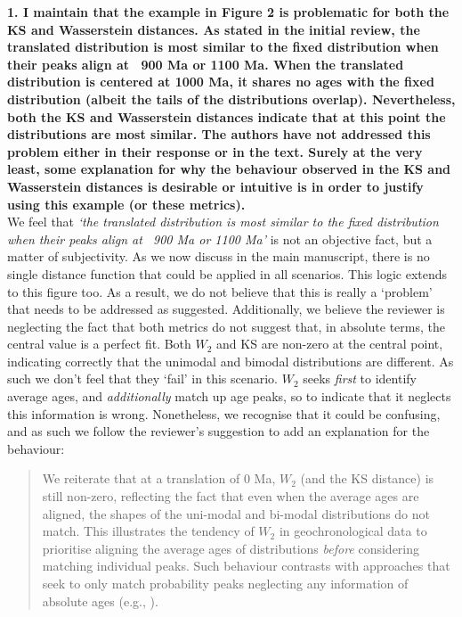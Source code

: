 \documentclass{article}[12p,a4paper]
\begin{document}
\textbf{1. I maintain that the example in Figure 2 is problematic for both the KS and Wasserstein distances. As stated in the initial review, the translated distribution is most similar to the fixed distribution when their peaks align at ~900 Ma or 1100 Ma. When the translated distribution is centered at 1000 Ma, it shares no ages with the fixed distribution (albeit the tails of the distributions overlap). Nevertheless, both the KS and Wasserstein distances indicate that at this point the distributions are most similar. The authors have not addressed this problem either in their response or in the text. Surely at the very least, some explanation for why the behaviour observed in the KS and Wasserstein distances is desirable or intuitive is in order to justify using this example (or these metrics). }\\

We feel that \textit{`the translated distribution is most similar to the fixed distribution when their peaks align at ~900 Ma or 1100 Ma'} is not an objective fact, but a matter of subjectivity. As we now discuss in the main manuscript, there is no single distance function that could be applied in all scenarios. This logic extends to this figure too. As a result, we do not believe that this is really a `problem' that needs to be addressed as suggested. Additionally, we believe the reviewer is neglecting the fact that both metrics do not suggest that, in absolute terms, the central value is a perfect fit. Both $W_2$ and KS are non-zero at the central point, indicating correctly that the unimodal and bimodal distributions are different. As such we don't feel that they `fail' in this scenario. $W_2$ seeks \textit{first} to identify average ages, and \textit{additionally} match up age peaks, so to indicate that it neglects this information is wrong. Nonetheless, we recognise that it could be confusing, and as such we follow the reviewer's suggestion to add an explanation for the behaviour:

\begin{quote}
    We reiterate that at a translation of 0 Ma, $W_2$ (and the KS distance) is still non-zero, reflecting the fact that even when the average ages are aligned, the shapes of the uni-modal and bi-modal distributions do not match. This illustrates the tendency of $W_2$ in geochronological data to prioritise aligning the average ages of distributions \textit{before} considering matching individual peaks. Such behaviour contrasts with approaches that seek to only match probability peaks neglecting any information of absolute ages (e.g., \cite{saylor_quantifying_2016}).    
\end{quote}
\end{document}
